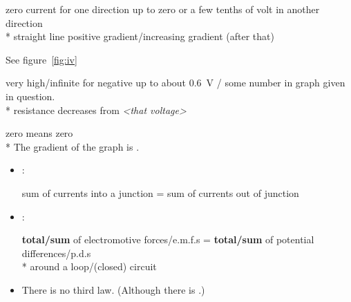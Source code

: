 \begin{question}%
  \label{q:iv2}%

  zero current for one direction up to zero or a few tenths of volt in another direction~\hfill{}\\*
  straight line positive gradient/increasing gradient (after that)~\hfill{}

  See figure~\ref{fig:iv}
\end{question}

\begin{question}%
  \label{q:iv3}%

  very high/infinite  for negative  up to about \SI{0.6}{V} / some number in graph given
  in question.~\hfill{}\\*
  resistance decreases from \textit{<that voltage>}~\hfill{}

  \NOT zero  means zero \\*
  The gradient of the graph is \NOT {}.
\end{question}

\begin{question}%

  \begin{itemize}
    \item {}:

      sum of currents into a junction = sum of currents out of junction~\hfill{}

    \item {}:

      \textbf{total/sum} of electromotive forces/e.m.f.s = \textbf{total/sum} of potential differences/p.d.s~\hfill{}\\*
      around a loop/(closed) circuit~\hfill{}

    \item There is no third law. (Although there is .)
  \end{itemize}
\end{question}

